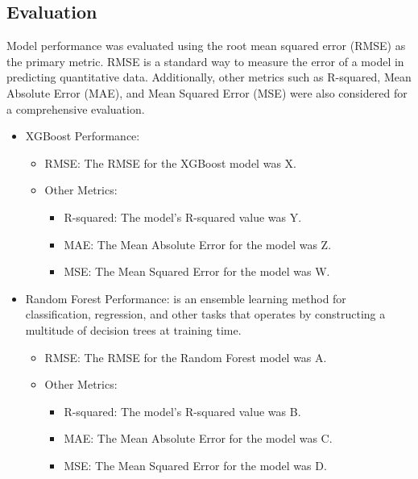 \documentclass[letterpaper, 10 pt, conference]{ieeeconf}  %
\begin{document}
\subsection{Evaluation}
Model performance was evaluated using the root mean squared error (RMSE) as the primary metric. RMSE is a standard way to measure the error of a model in predicting quantitative data. Additionally, other metrics such as R-squared, Mean Absolute Error (MAE), and Mean Squared Error (MSE) were also considered for a comprehensive evaluation.
\begin{itemize}
        \item XGBoost Performance: 
        
        \begin{itemize}
                \item RMSE: The RMSE for the XGBoost model was X.
                \item Other Metrics:
                \begin{itemize}
                        \item R-squared: The model's R-squared value was Y.
                        \item MAE: The Mean Absolute Error for the model was Z.
                        \item MSE: The Mean Squared Error for the model was W.
                \end{itemize}
        \end{itemize}
        
        \item Random Forest Performance: is an ensemble learning method for classification, regression, and other tasks that operates by constructing a multitude of decision trees at training time.
        
        \begin{itemize}
                \item RMSE: The RMSE for the Random Forest model was A.
                \item Other Metrics:
                \begin{itemize}
                        \item R-squared: The model's R-squared value was B.
                        \item MAE: The Mean Absolute Error for the model was C.
                        \item MSE: The Mean Squared Error for the model was D.
                \end{itemize}
        \end{itemize}
\end{itemize}
\end{document}
